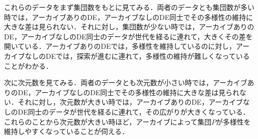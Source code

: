 \documentclass[a4paper,11pt,oneside,openany]{jsbook}
\begin{document}
これらのデータをまず集団数をもとに見てみる．両者のデータとも集団数が多い時では，アーカイブありのDE，アーカイブなしのDE同士でその多様性の維持に大きな差は見られない．それに対し，集団数が少ない時では，アーカイブありのDE，アーカイブなしのDE同士のデータが世代を経るに連れて，大きくその差を開いている．アーカイブありのDEでは，多様性を維持しているのに対し，アーカイブなしのDEでは，探索が進むに連れて，多様性の維持が難しくなっていることがわかる．

次に次元数を見てみる．両者のデータとも次元数が小さい時では，アーカイブありのDE，アーカイブなしのDE同士でその多様性の維持に大きな差は見られない．それに対し，次元数が大きい時では，アーカイブありのDE，アーカイブなしのDE同士のデータが世代を経るに連れて，その広がりが大きくなっている．これらのことから次元数が大きい時ほど，アーカイブによって集団$P$が多様性を維持しやすくなっていることが伺える．
\end{document}
